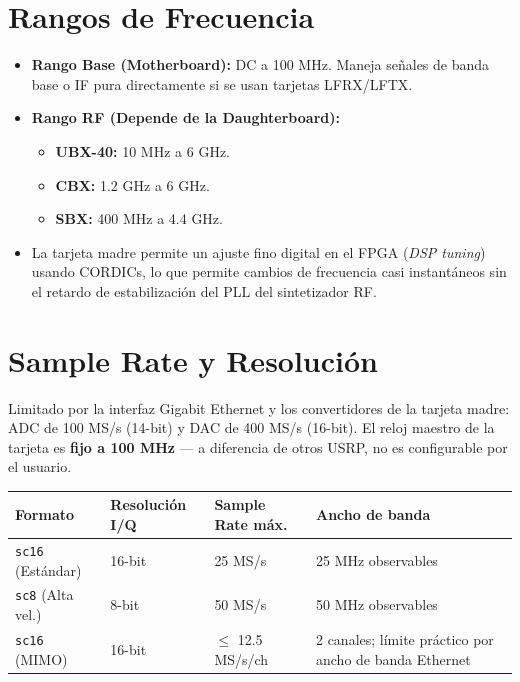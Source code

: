 \documentclass[11pt]{article}
\begin{document}
\section{Rangos de Frecuencia}

\begin{itemize}
    \item \textbf{Rango Base (Motherboard):} DC a 100 MHz. Maneja señales de banda base o IF pura directamente si se usan tarjetas LFRX/LFTX.
    \item \textbf{Rango RF (Depende de la Daughterboard):}
    \begin{itemize}
        \item \textbf{UBX-40:} 10 MHz a 6 GHz.
        \item \textbf{CBX:} 1.2 GHz a 6 GHz.
        \item \textbf{SBX:} 400 MHz a 4.4 GHz.
    \end{itemize}
    \item La tarjeta madre permite un ajuste fino digital en el FPGA (\textit{DSP tuning}) usando CORDICs, lo que permite cambios de frecuencia casi instantáneos sin el retardo de estabilización del PLL del sintetizador RF.
\end{itemize}

\section{Sample Rate y Resolución}

Limitado por la interfaz Gigabit Ethernet y los convertidores de la tarjeta madre: ADC de 100 MS/s (14-bit) y DAC de 400 MS/s (16-bit). El reloj maestro de la tarjeta es \textbf{fijo a 100 MHz} — a diferencia de otros USRP, no es configurable por el usuario.

\begin{table}[h]
    \centering
    \begin{tabular}{llll}
        \toprule
        \textbf{Formato} & \textbf{Resolución I/Q} & \textbf{Sample Rate máx.} & \textbf{Ancho de banda} \\
        \midrule
        \texttt{sc16} (Estándar) & 16-bit & 25 MS/s & 25 MHz observables \\
        \texttt{sc8} (Alta vel.)  & 8-bit  & 50 MS/s & 50 MHz observables \\
        \texttt{sc16} (MIMO)     & 16-bit & $\leq$ 12.5 MS/s/ch & 2 canales; límite práctico por ancho de banda Ethernet \\
        \bottomrule
    \end{tabular}
\end{table}
\end{document}
